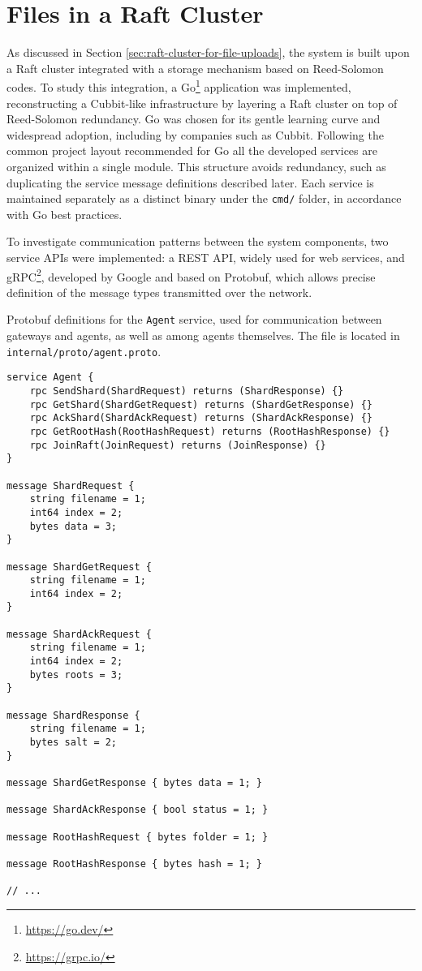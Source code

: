 \section{Files in a Raft Cluster}

As discussed in Section \ref{sec:raft-cluster-for-file-uploads}, the system is built upon a Raft cluster integrated with a storage mechanism based on Reed-Solomon codes. To study this integration, a Go\footnote{\url{https://go.dev/}} application was implemented, reconstructing a Cubbit-like infrastructure by layering a Raft cluster on top of Reed-Solomon redundancy. Go was chosen for its gentle learning curve and widespread adoption, including by companies such as Cubbit. Following the common project layout recommended for Go\cite{go-modules-layout} all the developed services are organized within a single module. This structure avoids redundancy, such as duplicating the service message definitions described later. Each service is maintained separately as a distinct binary under the \texttt{cmd/} folder, in accordance with Go best practices.



To investigate communication patterns between the system components, two service APIs were implemented: a REST API, widely used for web services, and gRPC\footnote{\url{https://grpc.io/}}, developed by Google and based on Protobuf, which allows precise definition of the message types transmitted over the network.

\begin{listing}[H]
\caption{Protobuf definitions for the \texttt{Agent} service, used for communication between gateways and agents, as well as among agents themselves. The file is located in \texttt{internal/proto/agent.proto}.}
\label{code:protobuf-for-agent}
\begin{verbatim}
service Agent {
    rpc SendShard(ShardRequest) returns (ShardResponse) {}
    rpc GetShard(ShardGetRequest) returns (ShardGetResponse) {}
    rpc AckShard(ShardAckRequest) returns (ShardAckResponse) {}
    rpc GetRootHash(RootHashRequest) returns (RootHashResponse) {}
    rpc JoinRaft(JoinRequest) returns (JoinResponse) {}
}

message ShardRequest {
    string filename = 1;
    int64 index = 2;
    bytes data = 3;
}

message ShardGetRequest {
    string filename = 1;
    int64 index = 2;
}

message ShardAckRequest {
    string filename = 1;
    int64 index = 2;
    bytes roots = 3;
}

message ShardResponse {
    string filename = 1;
    bytes salt = 2;
}

message ShardGetResponse { bytes data = 1; }

message ShardAckResponse { bool status = 1; }

message RootHashRequest { bytes folder = 1; }

message RootHashResponse { bytes hash = 1; }

// ...
\end{verbatim}
\end{listing}

